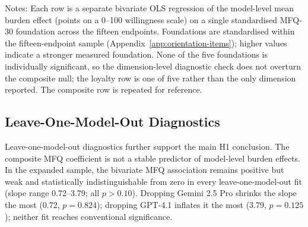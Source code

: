\documentclass[11pt]{article}
\begin{document}
\begin{table}[htbp]
\centering
\caption{Foundation-specific H1 regressions in the fifteen-endpoint sample}
\label{tab:h1_dimension_checks}
\begin{flushleft}
\footnotesize Notes: Each row is a separate bivariate OLS regression of the model-level mean burden effect (points on a 0--100 willingness scale) on a single standardised MFQ-30 foundation across the fifteen endpoints. Foundations are standardised within the fifteen-endpoint sample (Appendix~\ref{app:orientation-items}); higher values indicate a stronger measured foundation. None of the five foundations is individually significant, so the dimension-level diagnostic check does not overturn the composite null; the loyalty row is one of five rather than the only dimension reported. The composite row is repeated for reference.
\end{flushleft}
\end{table}

\subsection{Leave-One-Model-Out Diagnostics}

Leave-one-model-out diagnostics further support the main H1 conclusion. The composite MFQ coefficient is not a stable predictor of model-level burden effects. In the expanded sample, the bivariate MFQ association remains positive but weak and statistically indistinguishable from zero in every leave-one-model-out fit (slope range 0.72--3.79; all \(p > 0.10\)). Dropping Gemini 2.5 Pro shrinks the slope the most (0.72, \(p=0.824\)); dropping GPT-4.1 inflates it the most (3.79, \(p=0.125\)); neither fit reaches conventional significance.
\end{document}
